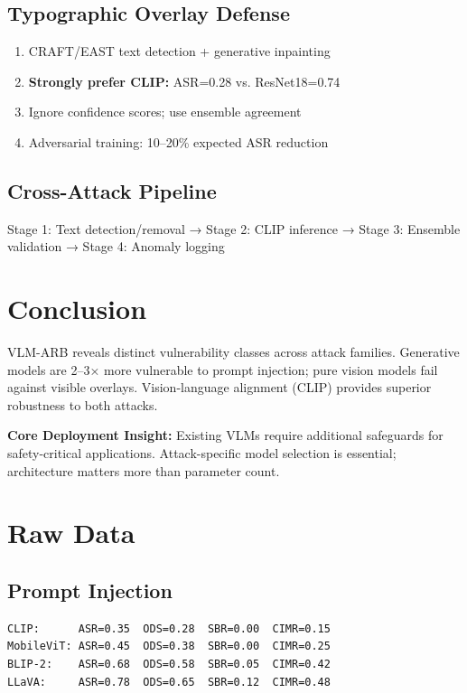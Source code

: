 \documentclass[11pt]{article}
\begin{document}
\subsection{Typographic Overlay Defense}

\begin{enumerate}[leftmargin=1.5em]
    \item CRAFT/EAST text detection + generative inpainting
    \item \textbf{Strongly prefer CLIP:} ASR=0.28 vs. ResNet18=0.74
    \item Ignore confidence scores; use ensemble agreement
    \item Adversarial training: 10--20\% expected ASR reduction
\end{enumerate}

\subsection{Cross-Attack Pipeline}

Stage 1: Text detection/removal → Stage 2: CLIP inference → Stage 3: Ensemble validation → Stage 4: Anomaly logging

\section{Conclusion}

VLM-ARB reveals distinct vulnerability classes across attack families. Generative models are 2--3× more vulnerable to prompt injection; pure vision models fail against visible overlays. Vision-language alignment (CLIP) provides superior robustness to both attacks.

\textbf{Core Deployment Insight:} Existing VLMs require additional safeguards for safety-critical applications. Attack-specific model selection is essential; architecture matters more than parameter count.

\appendix

\section{Raw Data}

\subsection{Prompt Injection}

\begin{verbatim}
CLIP:      ASR=0.35  ODS=0.28  SBR=0.00  CIMR=0.15
MobileViT: ASR=0.45  ODS=0.38  SBR=0.00  CIMR=0.25
BLIP-2:    ASR=0.68  ODS=0.58  SBR=0.05  CIMR=0.42
LLaVA:     ASR=0.78  ODS=0.65  SBR=0.12  CIMR=0.48
\end{verbatim}
\end{document}
